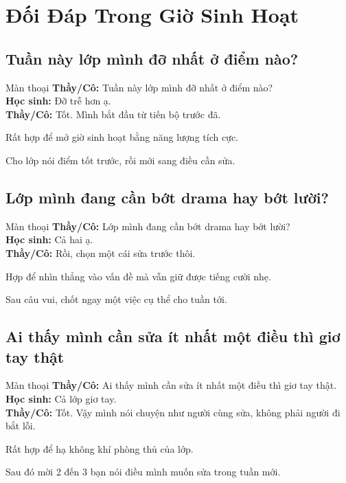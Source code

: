 \chapter{Đối Đáp Trong Giờ Sinh Hoạt}

\section{Tuần này lớp mình đỡ nhất ở điểm nào?}
\begin{manthoai}{Màn thoại}
\textbf{Thầy/Cô:} Tuần này lớp mình đỡ nhất ở điểm nào?\\
\textbf{Học sinh:} Đỡ trễ hơn ạ.\\
\textbf{Thầy/Cô:} Tốt. Mình bắt đầu từ tiến bộ trước đã.
\end{manthoai}
\begin{dungkhinào}
Rất hợp để mở giờ sinh hoạt bằng năng lượng tích cực.
\end{dungkhinào}
\begin{nhipthem}
Cho lớp nói điểm tốt trước, rồi mới sang điều cần sửa.
\end{nhipthem}
\ngancach

\section{Lớp mình đang cần bớt drama hay bớt lười?}
\begin{manthoai}{Màn thoại}
\textbf{Thầy/Cô:} Lớp mình đang cần bớt drama hay bớt lười?\\
\textbf{Học sinh:} Cả hai ạ.\\
\textbf{Thầy/Cô:} Rồi, chọn một cái sửa trước thôi.
\end{manthoai}
\begin{dungkhinào}
Hợp để nhìn thẳng vào vấn đề mà vẫn giữ được tiếng cười nhẹ.
\end{dungkhinào}
\begin{nhipthem}
Sau câu vui, chốt ngay một việc cụ thể cho tuần tới.
\end{nhipthem}
\ngancach

\section{Ai thấy mình cần sửa ít nhất một điều thì giơ tay thật}
\begin{manthoai}{Màn thoại}
\textbf{Thầy/Cô:} Ai thấy mình cần sửa ít nhất một điều thì giơ tay thật.\\
\textbf{Học sinh:} Cả lớp giơ tay.\\
\textbf{Thầy/Cô:} Tốt. Vậy mình nói chuyện như người cùng sửa, không phải người đi bắt lỗi.
\end{manthoai}
\begin{dungkhinào}
Rất hợp để hạ không khí phòng thủ của lớp.
\end{dungkhinào}
\begin{nhipthem}
Sau đó mời 2 đến 3 bạn nói điều mình muốn sửa trong tuần mới.
\end{nhipthem}
\ngancach

